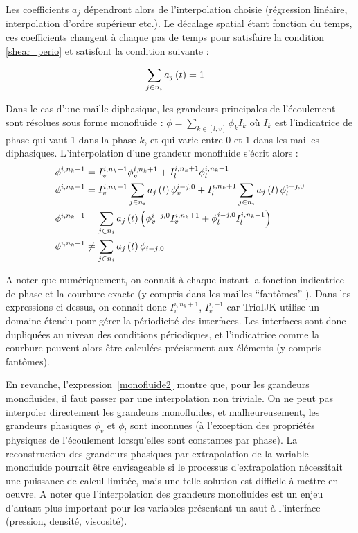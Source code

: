 Les coefficients $a_j$ dépendront alors de l'interpolation choisie (régression linéaire, interpolation d'ordre supérieur etc.). Le décalage spatial étant fonction du temps, ces coefficients changent à chaque pas de temps pour satisfaire la condition \eqref{shear_perio} et satisfont la condition suivante :

\begin{align}
\sum_{j\in n_{i}} a_j\left( t\right)&=1\label{coef}
\end{align}


Dans le cas d'une maille diphasique, les grandeurs principales de l'écoulement sont résolues sous forme monofluide : $\phi=\sum_{k\in[l,v]}\phi_kI_k$ où $I_k$ est l'indicatrice de phase qui vaut 1 dans la phase $k$, et qui varie entre $0$ et $1$ dans les mailles diphasiques. L'interpolation d'une grandeur monofluide s'écrit alors :
\begin{align}
\phi^{i,n_k+1}&=I^{i,n_k+1}_v\phi^{i,n_k+1}_v+I^{i,n_k+1}_l\phi^{i,n_k+1}_l\label{monofluide}\\
\phi^{i,n_k+1}&=I^{i,n_k+1}_v\sum_{j\in n_{i}} a_j\left( t\right)\phi^{i-j,0}_v+I^{i,n_k+1}_l\sum_{j\in n_{i}} a_j\left( t\right)\phi^{i-j,0}_l\\
\phi^{i,n_k+1}&=\sum_{j\in n_{i}} a_j\left( t\right)\left( \phi^{i-j,0}_vI^{i,n_k+1}_v+\phi^{i-j,0}_lI^{i,n_k+1}_l\right)\\
\phi^{i,n_k+1}&\neq \sum_{j\in n_{i}} a_j\left( t\right)\phi_{i-j,0}\label{monofluide2}
\end{align}

A noter que numériquement, on connait à chaque instant la fonction indicatrice de phase et la courbure exacte (y compris dans les mailles ``fantômes'' ). Dans les expressions ci-dessus, on connait donc $I^{i,n_k+1}_v$, $I^{i,-1}_v$ car TrioIJK utilise un domaine étendu pour gérer la périodicité des interfaces. Les interfaces sont donc dupliquées au niveau des conditions périodiques, et l'indicatrice comme la courbure peuvent alors être calculées précisement aux éléments (y compris fantômes). 

En revanche, l'expression~\eqref{monofluide2} montre que, pour les grandeurs monofluides, il faut passer par une interpolation non triviale. On ne peut pas interpoler directement les grandeurs monofluides, et malheureusement, les grandeurs phasiques $\phi_v$ et $\phi_l$ sont inconnues (à l'exception des propriétés physiques de l'écoulement lorsqu'elles sont constantes par phase). La reconstruction des grandeurs phasiques par extrapolation de la variable monofluide pourrait être envisageable si le processus d'extrapolation nécessitait une puissance de calcul limitée, mais une telle solution est difficile à mettre en oeuvre. A noter que l'interpolation des grandeurs monofluides est un enjeu d'autant plus important pour les variables présentant un saut à l'interface (pression, densité, viscosité). 

